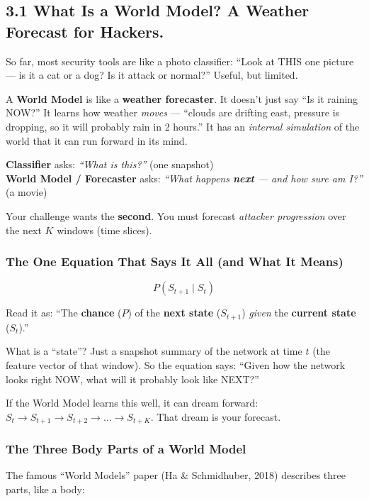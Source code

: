 \documentclass[11pt,a4paper]{article}
\begin{document}
\subsection{3.1 What Is a World Model? A Weather Forecast for Hackers.}
\label{sec:worldmodel}

So far, most security tools are like a photo classifier: ``Look at THIS one
picture --- is it a cat or a dog? Is it attack or normal?'' Useful, but
limited.

A \textbf{World Model} is like a \textbf{weather forecaster}. It doesn't just
say ``Is it raining NOW?'' It learns how weather \emph{moves} --- ``clouds are
drifting east, pressure is dropping, so it will probably rain in 2 hours.''
It has an \emph{internal simulation} of the world that it can run forward in
its mind.

\begin{keybox}
\textbf{Classifier} asks: \emph{``What is this?''} (one snapshot)\\
\textbf{World Model / Forecaster} asks: \emph{``What happens \textbf{next} --- and
how sure am I?''} (a movie)

Your challenge wants the \textbf{second}. You must forecast \emph{attacker
progression} over the next $K$ windows (time slices).
\end{keybox}

\subsubsection{The One Equation That Says It All (and What It Means)}

\[
P(S_{t+1} \mid S_t)
\]

Read it as: ``The \textbf{chance} ($P$) of the \textbf{next state}
($S_{t+1}$) \emph{given} the \textbf{current state} ($S_t$).''

What is a ``state''? Just a snapshot summary of the network at time $t$
(the feature vector of that window). So the equation says: ``Given how the
network looks right NOW, what will it probably look like NEXT?''

If the World Model learns this well, it can dream forward:
$ S_t \to S_{t+1} \to S_{t+2} \to \dots \to S_{t+K}$.
That dream is your forecast.

\subsubsection{The Three Body Parts of a World Model}

The famous ``World Models'' paper (Ha \& Schmidhuber, 2018) describes three parts,
like a body:
\end{document}
